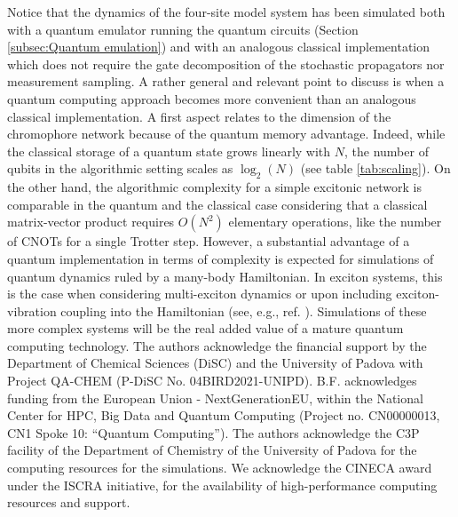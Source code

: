 \documentclass[12pt, amsmath, amssymb, graphicx]{iopart}
\begin{document}
Notice that the dynamics of the four-site model system has been simulated both with a quantum emulator running the quantum circuits (Section \ref{subsec:Quantum emulation}) and with an analogous classical implementation which does not require the gate decomposition of the stochastic propagators nor measurement sampling. A rather general and relevant point to discuss is when a quantum computing approach becomes more convenient than an analogous classical implementation. A first aspect relates to the dimension of the chromophore network because of the quantum memory advantage. Indeed, while the classical storage of a quantum state grows linearly with $N$, the number of qubits in the algorithmic setting scales as $\log_2(N)$ (see table \ref{tab:scaling}). On the other hand, the algorithmic complexity for a simple excitonic network is comparable in the quantum and the classical case considering that a classical matrix-vector product requires $O(N^2)$ elementary operations, like the number of CNOTs for a single Trotter step. However, a substantial advantage of a quantum implementation in terms of complexity is expected for simulations of quantum dynamics ruled by a many-body Hamiltonian. In exciton systems, this is the case when considering multi-exciton dynamics or upon including exciton-vibration coupling into the Hamiltonian (see, e.g., ref. \cite{Bruschi2024}). Simulations of these more complex systems will be the real added value of a mature quantum computing technology.
\ack
The authors acknowledge the financial support by the Department of Chemical Sciences (DiSC) and the University of Padova with Project QA-CHEM (P-DiSC No. 04BIRD2021-UNIPD). B.F. acknowledges funding from the European Union - NextGenerationEU, within the National Center for HPC, Big Data and Quantum Computing (Project no. CN00000013, CN1 Spoke 10: ``Quantum Computing'').
The authors acknowledge the C3P facility of the Department of Chemistry of the University of Padova for the computing resources for the simulations.
We acknowledge the CINECA award under the ISCRA initiative, for the availability of high-performance computing resources and support.

\appendix
\end{document}
